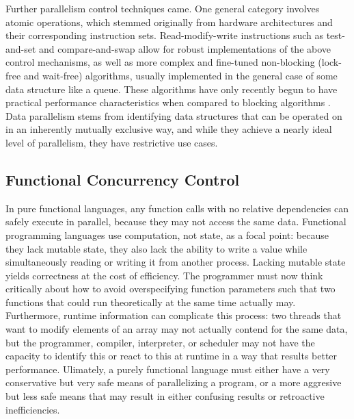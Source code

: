 Further parallelism control techniques came. One general category involves
atomic operations, which stemmed originally from hardware architectures and
their corresponding instruction sets. Read-modify-write instructions such as
test-and-set and compare-and-swap allow for robust implementations of the above
control mechanisms, as well as more complex and fine-tuned non-blocking
(lock-free and wait-free) algorithms, usually implemented in the general case of
some data structure like a queue. These algorithms have only recently begun to
have practical performance characteristics when compared to blocking algorithms
\cite{waitfree_queue}. Data parallelism stems from identifying data structures
that can be operated on in an inherently mutually exclusive way, and while they
achieve a nearly ideal level of parallelism, they have restrictive use cases.

\subsection{Functional Concurrency Control}
In pure functional languages, any function calls with no relative dependencies
can safely execute in parallel, because they may not access the same data.
Functional programming languages use computation, not state, as a focal point:
because they lack mutable state, they also lack the ability to write a value
while simultaneously reading or writing it from another process. Lacking mutable
state yields correctness at the cost of efficiency. The programmer must now
think critically about how to avoid overspecifying function parameters such that
two functions that could run theoretically at the same time actually may.
Furthermore, runtime information can complicate this process: two threads that
want to modify elements of an array may not actually contend for the same data,
but the programmer, compiler, interpreter, or scheduler may not have the
capacity to identify this or react to this at runtime in a way that results
better performance. Ulimately, a purely functional language must either have a
very conservative but very safe means of parallelizing a program, or a more
aggresive but less safe means that may result in either confusing results or
retroactive inefficiencies.

